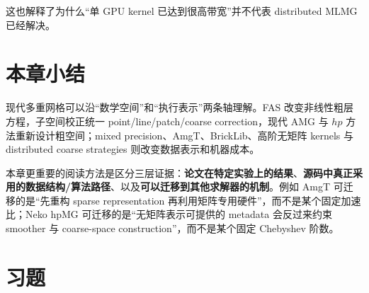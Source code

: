 这也解释了为什么“单 GPU kernel 已达到很高带宽”并不代表 distributed MLMG 已经解决。

\section{本章小结}
现代多重网格可以沿“数学空间”和“执行表示”两条轴理解。FAS 改变非线性粗层方程，子空间校正统一 point/line/patch/coarse correction，现代 AMG 与 $hp$ 方法重新设计粗空间；mixed precision、AmgT、BrickLib、高阶无矩阵 kernels 与 distributed coarse strategies 则改变数据表示和机器成本。

本章更重要的阅读方法是区分三层证据：\textbf{论文在特定实验上的结果}、\textbf{源码中真正采用的数据结构/算法路径}、以及\textbf{可以迁移到其他求解器的机制}。例如 AmgT 可迁移的是“先重构 sparse representation 再利用矩阵专用硬件”，而不是某个固定加速比；Neko hpMG 可迁移的是“无矩阵表示可提供的 metadata 会反过来约束 smoother 与 coarse-space construction”，而不是某个固定 Chebyshev 阶数。

\section*{习题}

